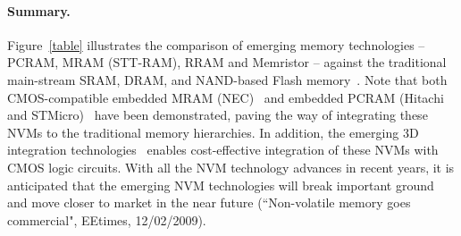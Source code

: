 \paragraph{Summary.}
Figure~\ref{table} illustrates the comparison of emerging memory technologies -- PCRAM, MRAM (STT-RAM), RRAM and Memristor -- against the traditional main-stream SRAM, DRAM, and NAND-based Flash memory~\cite{ITRS07}. Note that both CMOS-compatible embedded MRAM (NEC)~\cite{MRAM:NEC09} and embedded PCRAM (Hitachi and STMicro)~\cite{Hanzawa07,PRAM:ST2004} have been demonstrated, paving the way of integrating these NVMs to the traditional memory hierarchies. In addition, the emerging 3D integration technologies~\cite{xie:jetcs06,Xie:dac08} enables cost-effective integration of these NVMs with CMOS logic circuits. With all the NVM technology advances in recent years, it is anticipated that the emerging NVM technologies will break important ground and move closer to market in the near future (``Non-volatile memory goes commercial", EEtimes, 12/02/2009).


